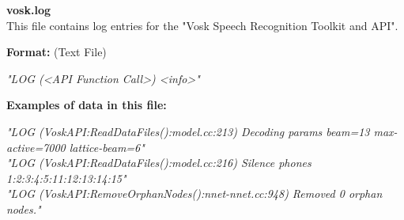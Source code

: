 \begin{description}
\begin{addmargin}[0em]{0em}
    \label{vosk.log}
    \begin{addmargin}[1em]{0em} %
        \textbf{vosk.log}\\
        This file contains log entries for the "Vosk Speech Recognition Toolkit and API".
        \begin{addmargin}[1em]{0em}
            \textbf{Format:} (Text File)
            \begin{addmargin}[1em]{0em}
                \textit{"LOG (<API Function Call>) <info>"}
            \end{addmargin}
        \end{addmargin}
        \begin{addmargin}[1em]{0em}
            \textbf{Examples of data in this file:}
            \begin{addmargin}[1em]{0em}\textit{"LOG (VoskAPI:ReadDataFiles():model.cc:213) Decoding params beam=13 max-active=7000 lattice-beam=6"\\
                "LOG (VoskAPI:ReadDataFiles():model.cc:216) Silence phones 1:2:3:4:5:11:12:13:14:15"\\
                "LOG (VoskAPI:RemoveOrphanNodes():nnet-nnet.cc:948) Removed 0 orphan nodes."}
            \end{addmargin}
        \end{addmargin}
    \end{addmargin} %
    \textbf{\\}

\end{addmargin} %



\end{description}
